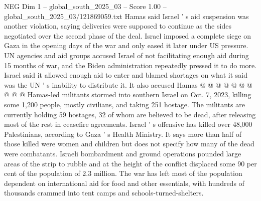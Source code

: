 \begin{textsample}{NEG Dim 1 – global\_south\_2025\_03 – Score 1.00 – global\_south\_2025\_03/121869059.txt}
Hamas said Israel ' s aid suspension was another violation, saying deliveries were supposed to continue as the sides negotiated over the second phase of the deal.
Israel imposed a complete siege on Gaza in the opening days of the war and only eased it later under US pressure.
UN agencies and aid groups accused Israel of not facilitating enough aid during 15 months of war, and the Biden administration repeatedly pressed it to do more.
Israel said it allowed enough aid to enter and blamed shortages on what it said was the UN ' s inability to distribute it.
It also accused Hamas @ @ @ @ @ @ @ @ @ @ Hamas-led militants stormed into southern Israel on Oct. 7, 2023, killing some 1,200 people, mostly civilians, and taking 251 hostage.
The militants are currently holding 59 hostages, 32 of whom are believed to be dead, after releasing most of the rest in ceasefire agreements.
Israel ' s offensive has killed over 48,000 Palestinians, according to Gaza ' s Health Ministry.
It says more than half of those killed were women and children but does not specify how many of the dead were combatants.
Israeli bombardment and ground operations pounded large areas of the strip to rubble and at the height of the conflict displaced some 90 per cent of the population of 2.3 million.
The war has left most of the population dependent on international aid for food and other essentials, with hundreds of thousands crammed into tent camps and schools-turned-shelters.

\end{textsample}
